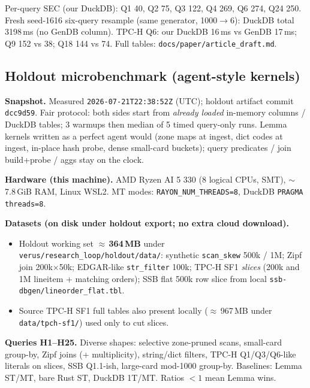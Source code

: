 \documentclass[sigconf, nonacm]{acmart}
\begin{document}
Per-query SEC (our DuckDB): Q1 40, Q2 75, Q3 122, Q4 269, Q6 274, Q24 250.
Fresh seed-1616 six-query resample (same generator, 1000$\to$6): DuckDB total
3198\,ms (no GenDB column). TPC-H Q6: our DuckDB 16\,ms vs GenDB 17\,ms;
Q9 152 vs 38; Q18 144 vs 74.
Full tables: \texttt{docs/paper/article\_draft.md}.

\subsection{Holdout microbenchmark (agent-style kernels)}
\label{sec:holdout-eval}

\noindent\textbf{Snapshot.}
Measured \texttt{2026-07-21T22:38:52Z} (UTC); holdout artifact commit \texttt{dcc9d59}.
Fair protocol: both sides
start from \emph{already loaded} in-memory columns / DuckDB tables; 3 warmups then
median of 5 timed query-only runs. Lemma kernels written as a perfect agent would
(zone maps at ingest, dict codes at ingest, in-place hash probe, dense small-card
buckets); query predicates / join build+probe / aggs stay on the clock.

\noindent\textbf{Hardware (this machine).}
AMD Ryzen AI 5 330 (8 logical CPUs, SMT), $\sim$7.8\,GiB RAM, Linux WSL2.
MT modes: \texttt{RAYON\_NUM\_THREADS=8}, DuckDB \texttt{PRAGMA threads=8}.

\noindent\textbf{Datasets (on disk under holdout export; no extra cloud download).}
\begin{itemize}
  \item Holdout working set $\approx$\,\textbf{364\,MB} under
        \texttt{verus/research\_loop/holdout/data/}:
        synthetic \texttt{scan\_skew} 500k / 1M; Zipf join 200k$\times$50k;
        EDGAR-like \texttt{str\_filter} 100k; TPC-H SF1 \emph{slices}
        (200k and 1M lineitem + matching orders); SSB flat 500k row slice
        from local \texttt{ssb-dbgen/lineorder\_flat.tbl}.
  \item Source TPC-H SF1 full tables also present locally ($\approx$\,967\,MB under
        \texttt{data/tpch-sf1/}) used only to cut slices.
\end{itemize}

\noindent\textbf{Queries H1--H25.} Diverse shapes: selective zone-pruned scans,
small-card group-by, Zipf joins (+ multiplicity), string/dict filters, TPC-H
Q1/Q3/Q6-like literals on slices, SSB Q1.1-ish, large-card mod-1000 group-by.
Baselines: Lemma ST/MT, bare Rust ST, DuckDB 1T/MT. Ratios $<1$ mean Lemma wins.
\end{document}
